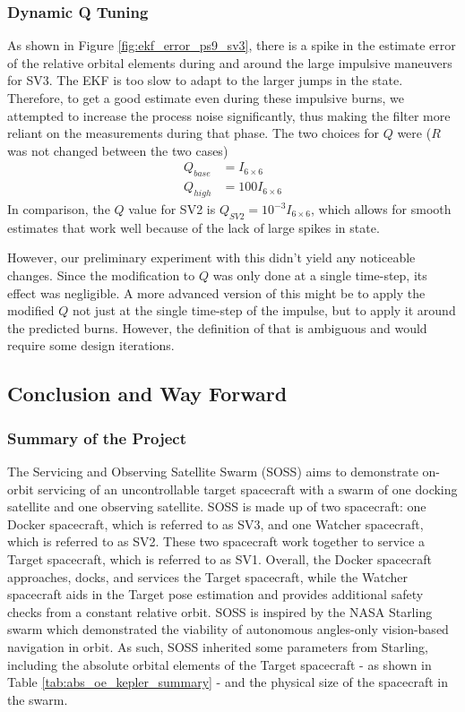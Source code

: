 \subsubsection{Dynamic Q Tuning}
As shown in Figure \ref{fig:ekf_error_ps9_sv3}, there is a spike in the estimate error of the relative orbital elements during and around the large impulsive maneuvers for SV3. The EKF is too slow to adapt to the larger jumps in the state. Therefore, to get a good estimate even during these impulsive burns, we attempted to increase the process noise significantly, thus making the filter more reliant on the measurements during that phase. The two choices for $Q$ were ($R$ was not changed between the two cases)
\begin{align}
    Q_{base} &= I_{6\times 6} \\
    Q_{high} &= 100I_{6\times 6}
\end{align}
In comparison, the $Q$ value for SV2 is $Q_{SV2} = 10^{-3}I_{6\times 6}$, which allows for smooth estimates that work well because of the lack of large spikes in state.

However, our preliminary experiment with this didn't yield any noticeable changes. Since the modification to $Q$ was only done at a single time-step, its effect was negligible. A more advanced version of this might be to apply the modified $Q$ not just at the single time-step of the impulse, but to apply it around the predicted burns. However, the definition of that is ambiguous and would require some design iterations.

\newpage
\subsection{Conclusion and Way Forward}
\subsubsection{Summary of the Project}
The Servicing and Observing Satellite Swarm (SOSS) aims to demonstrate on-orbit servicing of an uncontrollable target spacecraft with a swarm of one docking satellite and one observing satellite. SOSS is made up of two spacecraft: one Docker spacecraft, which is referred to as SV3, and one Watcher spacecraft, which is referred to as SV2. These two spacecraft work together to service a Target spacecraft, which is referred to as SV1. Overall, the Docker spacecraft approaches, docks, and services the Target spacecraft, while the Watcher spacecraft aids in the Target pose estimation and provides additional safety checks from a constant relative orbit. SOSS is inspired by the NASA Starling swarm which demonstrated the viability of autonomous angles-only vision-based navigation in orbit. As such, SOSS inherited some parameters from Starling, including the absolute orbital elements of the Target spacecraft - as shown in Table \ref{tab:abs_oe_kepler_summary} - and the physical size of the spacecraft in the swarm. 

